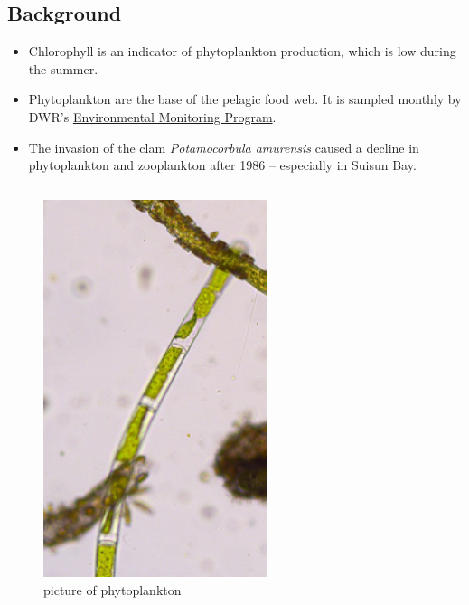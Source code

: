 \documentclass[
]{book}
\providecommand{\tightlist}{%
  \setlength{\itemsep}{0pt}\setlength{\parskip}{0pt}}
\begin{document}
\begin{columns-nocenter}

\begin{column}

\hypertarget{background-2}{%
\subsection{Background}\label{background-2}}

\begin{itemize}
\tightlist
\item
  Chlorophyll is an indicator of phytoplankton production, which is low during the summer.
\item
  Phytoplankton are the base of the pelagic food web. It is sampled monthly by DWR's \href{https://emp.baydeltalive.com/wiki/12297}{Environmental Monitoring Program}.
\item
  The invasion of the clam \emph{Potamocorbula amurensis} caused a decline in phytoplankton and zooplankton after 1986 -- especially in Suisun Bay.
\end{itemize}

\end{column}

\begin{column}

\begin{figure}

{\centering \includegraphics[width=2.57in]{figures/phyto} 

}

\caption{picture of phytoplankton}\label{fig:unnamed-chunk-61}
\end{figure}

\end{column}

\end{columns-nocenter}
\end{document}
